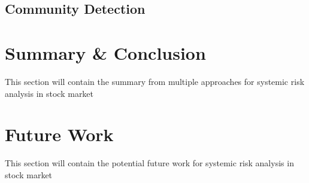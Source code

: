 \documentclass[a4paper,11pt]{article}
\begin{document}
\subsection{Community Detection}

\section{Summary \& Conclusion}
This section will contain the summary from multiple approaches for systemic risk analysis in stock market

\section{Future Work}
This section will contain the potential future work for systemic risk analysis in stock market



\small
\end{document}
